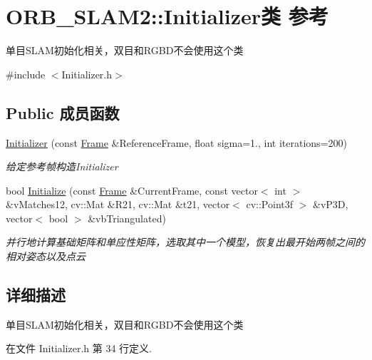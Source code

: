 \hypertarget{classORB__SLAM2_1_1Initializer}{\section{O\-R\-B\-\_\-\-S\-L\-A\-M2\-:\-:Initializer类 参考}
\label{classORB__SLAM2_1_1Initializer}
}


单目\-S\-L\-A\-M初始化相关，双目和\-R\-G\-B\-D不会使用这个类  




{\ttfamily \#include $<$Initializer.\-h$>$}

\subsection*{Public 成员函数}
\begin{DoxyCompactItemize}
\item 
\hyperlink{classORB__SLAM2_1_1Initializer_ac492345a970665cd8a1b1d8cf41d44af}{Initializer} (const \hyperlink{classORB__SLAM2_1_1Frame}{Frame} \&Reference\-Frame, float sigma=1., int iterations=200)
\begin{DoxyCompactList}\small\item\em 给定参考帧构造\-Initializer \end{DoxyCompactList}\item 
bool \hyperlink{classORB__SLAM2_1_1Initializer_a40d41840e2bdb7199ab024871d028c2c}{Initialize} (const \hyperlink{classORB__SLAM2_1_1Frame}{Frame} \&Current\-Frame, const vector$<$ int $>$ \&v\-Matches12, cv\-::\-Mat \&R21, cv\-::\-Mat \&t21, vector$<$ cv\-::\-Point3f $>$ \&v\-P3\-D, vector$<$ bool $>$ \&vb\-Triangulated)
\begin{DoxyCompactList}\small\item\em 并行地计算基础矩阵和单应性矩阵，选取其中一个模型，恢复出最开始两帧之间的相对姿态以及点云 \end{DoxyCompactList}\end{DoxyCompactItemize}


\subsection{详细描述}
单目\-S\-L\-A\-M初始化相关，双目和\-R\-G\-B\-D不会使用这个类 

在文件 Initializer.\-h 第 34 行定义.



